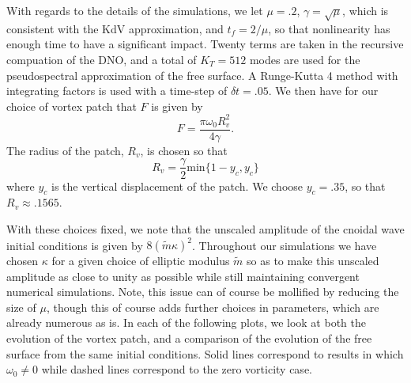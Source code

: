 \documentclass[a4paper,11pt]{article}
\begin{document}
With regards to the details of the simulations, we let $\mu=.2$, $\gamma = \sqrt{\mu}$, which is consistent with the KdV approximation, and $t_{f}=2/\mu$, so that nonlinearity has enough time to have a significant impact.  Twenty terms are taken in the recursive compuation of the DNO, and a total of $K_{T}=512$ modes are used for the pseudospectral approximation of the free surface.  A Runge-Kutta 4 method with integrating factors is used with a time-step of $\delta t = .05$.   We then have for our choice of vortex patch that $F$ is given by 
\[
F = \frac{\pi \omega_{0}R_{v}^{2}}{4\gamma}.
\]
The radius of the patch, $R_{v}$, is chosen so that
\[
R_{v} = \frac{\gamma}{2}\mbox{min}\{1-y_{c},y_{c}\}
\]
where $y_{c}$ is the vertical displacement of the patch.  We choose $y_{c}=.35$, so that $R_{v}\approx.1565$.  

With these choices fixed, we note that the unscaled amplitude of the cnoidal wave initial conditions is given by $8(\tilde{m}\kappa)^{2}$.  Throughout our simulations we have chosen $\kappa$ for a given choice of elliptic modulus $\tilde{m}$ so as to make this unscaled amplitude as close to unity as possible while still maintaining convergent numerical simulations.  Note, this issue can of course be mollified by reducing the size of $\mu$, though this of course adds further choices in parameters, which are already numerous as is.  In each of the following plots, we look at both the evolution of the vortex patch, and a comparison of the evolution of the free surface from the same initial conditions.  Solid lines correspond to results in which $\omega_{0}\neq0$ while dashed lines correspond to the zero vorticity case.  
\end{document}
